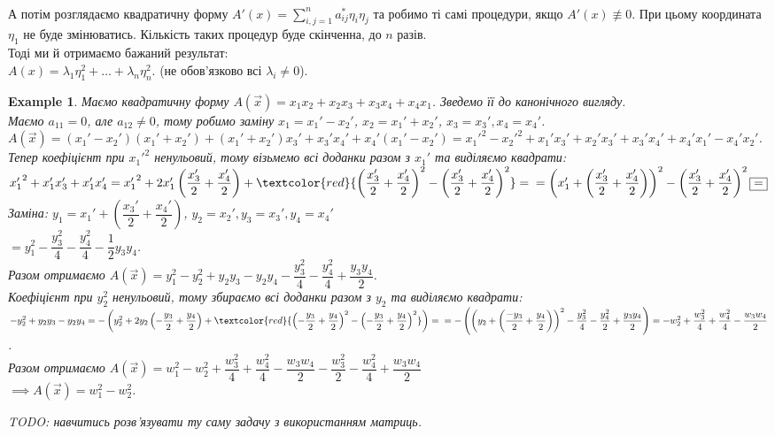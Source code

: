 \documentclass[a4paper, 10pt]{article}
\theoremstyle{theoremdd}
\newtheorem{example}[theorem]{Example}
\begin{document}
\bigskip \\
А потім розглядаємо квадратичну форму $A'(x) = \displaystyle\sum_{i,j=1}^n a_{ij}^* \eta_i \eta_j$ та робимо ті самі процедури, якщо $A'(x) \not\equiv 0$. При цьому координата $\eta_1$ не буде змінюватись. Кількість таких процедур буде скінченна, до $n$ разів.\\
Тоді ми й отримаємо бажаний результат:\\
$A(x) = \lambda_1 \eta_1^2 + \dots + \lambda_n \eta_n^2$. (не обов'язково всі $\lambda_i \neq 0$).

\begin{example}
Маємо квадратичну форму $A(\vec{x}) = x_1 x_2 + x_2 x_3 + x_3 x_4 + x_4 x_1$. Зведемо її до канонічного вигляду.\\
Маємо $a_{11} = 0$, але $a_{12} \neq 0$, тому робимо заміну $x_1 = x_1' - x_2'$, $x_2 = x_1' + x_2'$, $x_3 = x_3', x_4 = x_4'$.\\
$A(\vec{x}) = (x_1'-x_2')(x_1'+x_2') + (x_1'+x_2')x_3' + x_3' x_4' + x_4' (x_1' - x_2') = {x_1'}^2 - {x_2'}^2 + x_1'x_3' + x_2'x_3' + x_3' x_4' + x_4' x_1' - x_4' x_2'$.\\
Тепер коефіцієнт при ${x_1'}^2$ ненульовий, тому візьмемо всі доданки разом з $x_1'$ та виділяємо квадрати:\\
${x_1'}^2 + x_1'x_3' + x_1'x_4' = {x_1'}^2 + 2 x_1' \left( \dfrac{x_3'}{2} + \dfrac{x_4'}{2} \right) + \textcolor{red}{\left( \dfrac{x_3'}{2} + \dfrac{x_4'}{2} \right)^2 - \left(\dfrac{x_3'}{2} + \dfrac{x_4'}{2} \right)^2} = \\
= \left( x_1' + \left( \dfrac{x_3'}{2} + \dfrac{x_4'}{2} \right) \right)^2 - \left( \dfrac{x_3'}{2} + \dfrac{x_4'}{2} \right)^2 \boxed{=}$\\
Заміна: $y_1 = x_1' + \left( \dfrac{x_3'}{2} + \dfrac{x_4'}{2} \right)$, $y_2 = x_2', y_3 = x_3', y_4 = x_4'$\\
$\boxed{=} y_1^2  - \dfrac{y_3^2}{4} - \dfrac{y_4^2}{4} - \dfrac{1}{2}y_3y_4$.\\
Разом отримаємо $A(\vec{x}) = y_1^2 - y_2^2 + y_2y_3 - y_2y_4 - \dfrac{y_3^2}{4} - \dfrac{y_4^2}{4} + \dfrac{y_3y_4}{2}$.\\
Коефіцієнт при $y_2^2$ ненульовий, тому збираємо всі доданки разом з $y_2$ та виділяємо квадрати:\\
$-y_2^2 + y_2y_3 - y_2y_4 = -\left(y_2^2 +2y_2 \left( -\dfrac{y_3}{2} + \dfrac{y_4}{2} \right) + \textcolor{red}{\left( -\dfrac{y_3}{2} + \dfrac{y_4}{2} \right)^2 - \left( -\dfrac{y_3}{2} + \dfrac{y_4}{2} \right)^2} \right) = \\ 
= - \left( \left( y_2 + \left( \dfrac{-y_3}{2} + \dfrac{y_4}{2} \right) \right)^2 - \dfrac{y_3^2}{4} - \dfrac{y_4^2}{2} + \dfrac{y_3y_4}{2} \right) = -w_2^2 + \dfrac{w_3^2}{4} + \dfrac{w_4^2}{4} - \dfrac{w_3 w_4}{2}$.\\
Разом отримаємо $A(\vec{x}) = w_1^2 - w_2^2 + \dfrac{w_3^2}{4} + \dfrac{w_4^2}{4} - \dfrac{w_3w_4}{2} - \dfrac{w_3^2}{2} - \dfrac{w_4^2}{4} + \dfrac{w_3w_4}{2}$\\
$\implies A(\vec{x}) = w_1^2 - w_2^2$.
\end{example}
\noindent
\textit{TODO: навчитись розв'язувати ту саму задачу з використанням матриць.}
\end{document}
